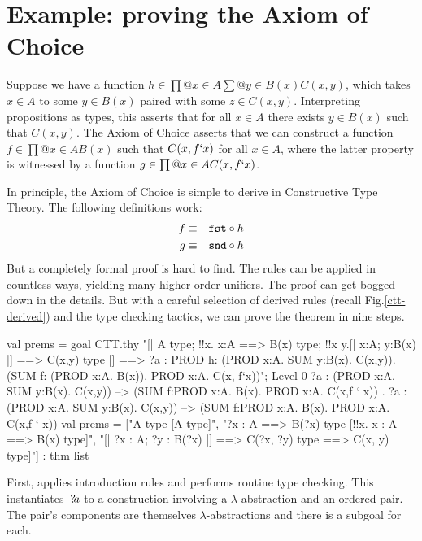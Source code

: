\section{Example: proving the Axiom of Choice} \label{ctt-choice}
Suppose we have a function $h\in \prod@{x\in A}\sum@{y\in B(x)} C(x,y)$,
which takes $x\in A$ to some $y\in B(x)$ paired with some $z\in C(x,y)$.
Interpreting propositions as types, this asserts that for all $x\in A$
there exists $y\in B(x)$ such that $C(x,y)$.  The Axiom of Choice asserts
that we can construct a function $f\in \prod@{x\in A}B(x)$ such that
$C(x,f{\tt`}x)$ for all $x\in A$, where the latter property is witnessed by a
function $g\in \prod@{x\in A}C(x,f{\tt`}x)$.

In principle, the Axiom of Choice is simple to derive in Constructive Type
Theory.  The following definitions work:
\begin{eqnarray*}
    f & \equiv & {\tt fst} \circ h \\
    g & \equiv & {\tt snd} \circ h
\end{eqnarray*}
But a completely formal proof is hard to find.  The rules can be applied in
countless ways, yielding many higher-order unifiers.  The proof can get
bogged down in the details.  But with a careful selection of derived rules
(recall Fig.\ts\ref{ctt-derived}) and the type checking tactics, we can
prove the theorem in nine steps.
\begin{ttbox}
val prems = goal CTT.thy
    "[| A type;  !!x. x:A ==> B(x) type;                    \ttback
\ttback       !!x y.[| x:A;  y:B(x) |] ==> C(x,y) type            \ttback
\ttback    |] ==> ?a : PROD h: (PROD x:A. SUM y:B(x). C(x,y)).    \ttback
\ttback                     (SUM f: (PROD x:A. B(x)). PROD x:A. C(x, f`x))";
{\out Level 0}
{\out ?a : (PROD x:A. SUM y:B(x). C(x,y)) -->}
{\out      (SUM f:PROD x:A. B(x). PROD x:A. C(x,f ` x))}
{. ?a : (PROD x:A. SUM y:B(x). C(x,y)) -->}
{\out          (SUM f:PROD x:A. B(x). PROD x:A. C(x,f ` x))}
\ttbreak
{\out val prems = ["A type  [A type]",}
{\out              "?x : A ==> B(?x) type  [!!x. x : A ==> B(x) type]",}
{\out              "[| ?x : A; ?y : B(?x) |] ==> C(?x, ?y) type}
{\out               [!!x y. [| x : A; y : B(x) |] ==> C(x, y) type]"]}
{\out             : thm list}
\end{ttbox}
First,  applies introduction rules and performs routine
type checking.  This instantiates~${?\!a}$ to a construction involving
a $\lambda$-abstraction and an ordered pair.  The pair's components are
themselves $\lambda$-abstractions and there is a subgoal for each.
